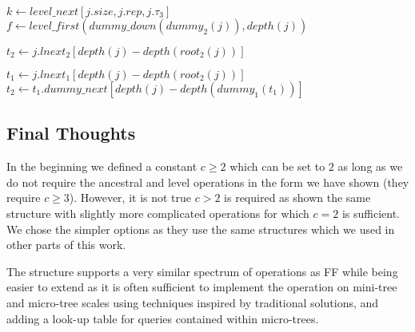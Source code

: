 \begin{algorithm}
\begin{algorithmic}
		\State {}
	\EndIf
	
	\State $k \gets level\_next[j.size, j.rep, j.\tau_3]$ 
	 
		\State $f \gets level\_first(dummy\_down(dummy_2(j)), depth(j))$
			\State {}
		\EndIf
		\State {} 
	\EndIf
	
	\State $t_2 \gets j.lnext_2[depth(j) - depth(root_2(j))]$ 
		\State {}
		\State {}
	\EndIf
	
	\State $t_1 \gets j.lnext_1[depth(j) - depth(root_2(j))]$ 
		\State $t_2 \gets t_1.dummy\_next[depth(j) - depth(dummy_1(t_1))]$
			\State {}
		\Else
			\State {}
		\EndIf
		\State {}
	\Else
		\State {}
	\EndIf
\EndFunction
\end{algorithmic}
\end{algorithm}

\subsection{Final Thoughts}

In the beginning we defined a constant $c \ge 2$ which can be set to $2$ as long as we do not require the ancestral and level operations in the form we have shown (they require $c \ge 3$).
However, it is not true $c >2$ is required as  shown the same structure with slightly more complicated operations for which $c = 2$ is sufficient.
We chose the simpler options as they use the same structures which we used in other parts of this work.

The structure supports a very similar spectrum of operations as FF while being easier to extend as it is often sufficient to implement the operation on mini-tree and micro-tree scales using techniques inspired by traditional solutions, and adding a look-up table for queries contained within micro-trees.

